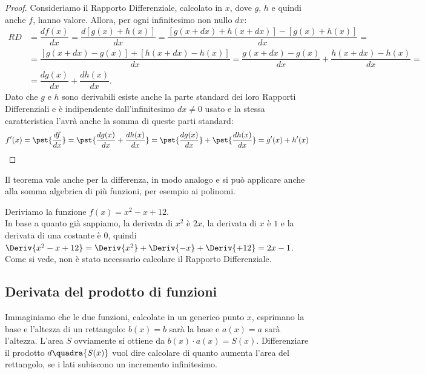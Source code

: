 \begin{proof}
Consideriamo il Rapporto Differenziale, calcolato in \(x\), dove \(g\), 
\(h\) e quindi anche \(f\), hanno valore. Allora, per ogni infinitesimo non 
nullo \(dx\):
\begin{align*}
 RD&=\dfrac{df(x)}{dx}=\dfrac{d[g(x)+ h(x)]}{dx}=\dfrac{[g(x+dx)+
     h(x+dx)]-[g(x) + h(x)]}{dx}=\\
 &= \dfrac{[g(x+dx)-g(x)] + [h(x+dx)-h(x)]}{dx}= 
 \dfrac{g(x+dx)-g(x)}{dx}+\dfrac{h(x+dx)-h(x)}{dx}=\\
  &=\dfrac{dg(x)}{dx}+\dfrac{dh(x)}{dx}.
\end{align*}
Dato che \(g\) e \(h\) sono derivabili esiste anche la parte standard dei 
loro Rapporti Differenziali e è indipendente dall'infinitesimo 
\(dx \neq 0\) usato e la stessa caratteristica l'avrà anche la somma di
queste parti standard:
\[f'(x)=\pst{\dfrac{df}{dx}}=\pst{\dfrac{dg(x)}{dx}+\dfrac{dh(x)}{dx}}=
        \pst{\dfrac{dg(x)}{dx}}+\pst{\dfrac{dh(x)}{dx}}=g'(x)+h'(x)\]
\end{proof}

\begin{osservazione}
 Il teorema vale anche per la differenza, in modo analogo e si può applicare 
anche alla somma algebrica di più funzioni, per esempio ai polinomi.
\end{osservazione}

\begin{esempio}
 Deriviamo la funzione \(f(x)= x^2-x+12\).\\
 In base a quanto già sappiamo, la derivata di \(x^2\) è \(2x\), la derivata 
di \(x\) è \(1\) e la derivata di una costante è \(0\), quindi 
\(\Deriv{x^2-x+12}= 
  \Deriv{x^2} + 
  \Deriv{-x} + 
  \Deriv{+12}=
  2x-1\).\\
Come si vede, non è stato necessario calcolare il Rapporto Differenziale.
\end{esempio}

\subsection{Derivata del prodotto di funzioni}
\label{subsec:differenziazione_derivataprodotto}


Immaginiamo che le due funzioni, calcolate in un generico punto \(x\),
esprimano la base e l'altezza di un rettangolo:
\(b(x)=b\) sarà la base  e \(a(x)=a\) sarà l'altezza. 
L'area \(\mathit{S}\) ovviamente si ottiene da \(b(x)\cdot 
a(x)=\mathit{S}(x)\). 
Differenziare il prodotto \(d\quadra{\mathit{S}(x)}\) vuol dire calcolare di
quanto aumenta l'area del rettangolo, se i lati subiscono un incremento 
infinitesimo. 

